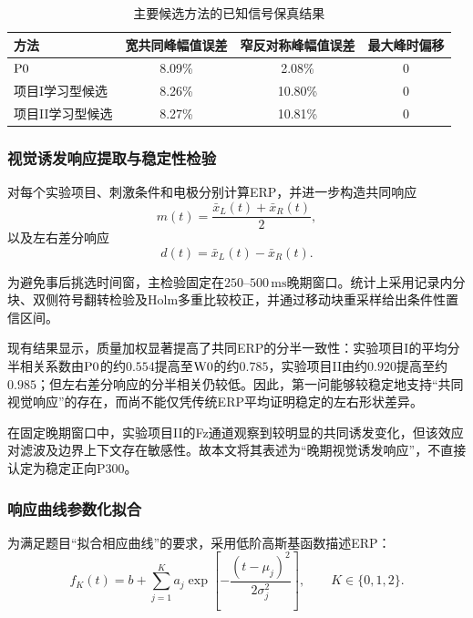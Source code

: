 \begin{table}[H]
\centering
\caption{主要候选方法的已知信号保真结果}
\label{tab:q1_fidelity}
\begin{tabular}{lccc}
\toprule
方法 & 宽共同峰幅值误差 & 窄反对称峰幅值误差 & 最大峰时偏移\\
\midrule
$\mathrm{P0}$ & 8.09\% & 2.08\% & 0\\
项目I学习型候选 & 8.26\% & 10.80\% & 0\\
项目II学习型候选 & 8.27\% & 10.81\% & 0\\
\bottomrule
\end{tabular}
\end{table}

\subsubsection{视觉诱发响应提取与稳定性检验}

对每个实验项目、刺激条件和电极分别计算ERP，并进一步构造共同响应
\begin{equation}
m(t)=\frac{\bar{x}_{L}(t)+\bar{x}_{R}(t)}{2},
\end{equation}
以及左右差分响应
\begin{equation}
d(t)=\bar{x}_{L}(t)-\bar{x}_{R}(t).
\end{equation}

为避免事后挑选时间窗，主检验固定在$250$--$500\,\mathrm{ms}$晚期窗口。统计上采用记录内分块、双侧符号翻转检验及Holm多重比较校正，并通过移动块重采样给出条件性置信区间。

现有结果显示，质量加权显著提高了共同ERP的分半一致性：实验项目I的平均分半相关系数由$\mathrm{P0}$的约$0.554$提高至$\mathrm{W0}$的约$0.785$，实验项目II由约$0.920$提高至约$0.985$；但左右差分响应的分半相关仍较低。因此，第一问能够较稳定地支持“共同视觉响应”的存在，而尚不能仅凭传统ERP平均证明稳定的左右形状差异。

在固定晚期窗口中，实验项目II的Fz通道观察到较明显的共同诱发变化，但该效应对滤波及边界上下文存在敏感性。故本文将其表述为“晚期视觉诱发响应”，不直接认定为稳定正向P300。

\subsubsection{响应曲线参数化拟合}

为满足题目“拟合相应曲线”的要求，采用低阶高斯基函数描述ERP：
\begin{equation}
f_K(t)
=
b+\sum_{j=1}^{K}
a_j
\exp\left[
-\frac{(t-\mu_j)^2}{2\sigma_j^2}
\right],
\qquad K\in\{0,1,2\}.
\label{eq:gaussian_fit}
\end{equation}

